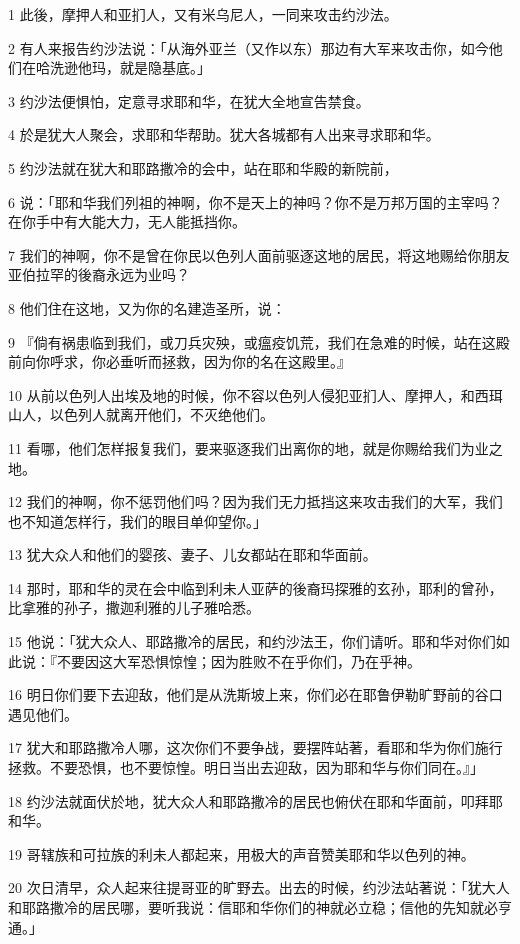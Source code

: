\par 1 此後，摩押人和亚扪人，又有米乌尼人，一同来攻击约沙法。
\par 2 有人来报告约沙法说：「从海外亚兰（又作以东）那边有大军来攻击你，如今他们在哈洗逊他玛，就是隐基底。」
\par 3 约沙法便惧怕，定意寻求耶和华，在犹大全地宣告禁食。
\par 4 於是犹大人聚会，求耶和华帮助。犹大各城都有人出来寻求耶和华。
\par 5 约沙法就在犹大和耶路撒冷的会中，站在耶和华殿的新院前，
\par 6 说：「耶和华我们列祖的神啊，你不是天上的神吗？你不是万邦万国的主宰吗？在你手中有大能大力，无人能抵挡你。
\par 7 我们的神啊，你不是曾在你民以色列人面前驱逐这地的居民，将这地赐给你朋友亚伯拉罕的後裔永远为业吗？
\par 8 他们住在这地，又为你的名建造圣所，说：
\par 9 『倘有祸患临到我们，或刀兵灾殃，或瘟疫饥荒，我们在急难的时候，站在这殿前向你呼求，你必垂听而拯救，因为你的名在这殿里。』
\par 10 从前以色列人出埃及地的时候，你不容以色列人侵犯亚扪人、摩押人，和西珥山人，以色列人就离开他们，不灭绝他们。
\par 11 看哪，他们怎样报复我们，要来驱逐我们出离你的地，就是你赐给我们为业之地。
\par 12 我们的神啊，你不惩罚他们吗？因为我们无力抵挡这来攻击我们的大军，我们也不知道怎样行，我们的眼目单仰望你。」
\par 13 犹大众人和他们的婴孩、妻子、儿女都站在耶和华面前。
\par 14 那时，耶和华的灵在会中临到利未人亚萨的後裔玛探雅的玄孙，耶利的曾孙，比拿雅的孙子，撒迦利雅的儿子雅哈悉。
\par 15 他说：「犹大众人、耶路撒冷的居民，和约沙法王，你们请听。耶和华对你们如此说：『不要因这大军恐惧惊惶；因为胜败不在乎你们，乃在乎神。
\par 16 明日你们要下去迎敌，他们是从洗斯坡上来，你们必在耶鲁伊勒旷野前的谷口遇见他们。
\par 17 犹大和耶路撒冷人哪，这次你们不要争战，要摆阵站著，看耶和华为你们施行拯救。不要恐惧，也不要惊惶。明日当出去迎敌，因为耶和华与你们同在。』」
\par 18 约沙法就面伏於地，犹大众人和耶路撒冷的居民也俯伏在耶和华面前，叩拜耶和华。
\par 19 哥辖族和可拉族的利未人都起来，用极大的声音赞美耶和华以色列的神。
\par 20 次日清早，众人起来往提哥亚的旷野去。出去的时候，约沙法站著说：「犹大人和耶路撒冷的居民哪，要听我说：信耶和华你们的神就必立稳；信他的先知就必亨通。」
